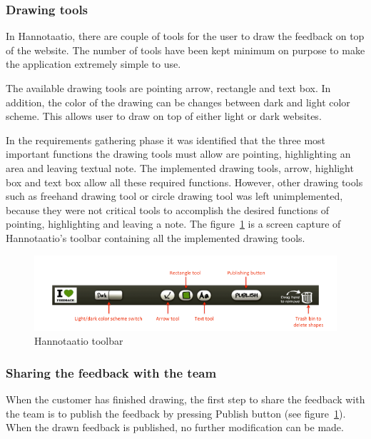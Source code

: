 \documentclass[english,12pt,a4paper,pdftex]{article}
\begin{document}
\subsubsection{Drawing tools}

In Hannotaatio, there are couple of tools for the user to draw the feedback on top of the website. The number of tools have been kept minimum on purpose to make the application extremely simple to use.

The available drawing tools are pointing arrow, rectangle and text box. In addition, the color of the drawing can be changes between dark and light color scheme. This allows user to draw on top of either light or dark websites.

In the requirements gathering phase it was identified that the three most important functions the drawing tools must allow are pointing, highlighting an area and leaving textual note. The implemented drawing tools, arrow, highlight box and text box allow all these required functions. However, other drawing tools such as freehand drawing tool or circle drawing tool was left unimplemented, because they were not critical tools to accomplish the desired functions of pointing, highlighting and leaving a note. The figure~\ref{fig:hannotaatio_toolbar} is a screen capture of Hannotaatio's toolbar containing all the implemented drawing tools.

\begin{figure}[htb]
\begin{center}
\includegraphics[width=1.0\textwidth]{drawing_tools_annotated_crop.png}
\end{center}
\caption{Hannotaatio toolbar}
\label{fig:hannotaatio_toolbar}
\end{figure}

\subsubsection{Sharing the feedback with the team}

When the customer has finished drawing, the first step to share the feedback with the team is to publish the feedback by pressing Publish button (see figure~\ref{fig:hannotaatio_toolbar}). When the drawn feedback is published, no further modification can be made.
\end{document}
